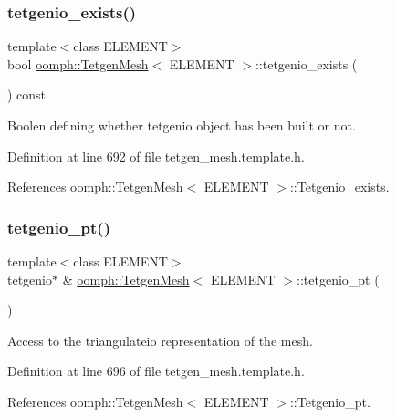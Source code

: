 \subsubsection{\texorpdfstring{tetgenio\+\_\+exists()}{tetgenio\_exists()}}
{\footnotesize\ttfamily template$<$class E\+L\+E\+M\+E\+NT$>$ \\
bool \hyperlink{classoomph_1_1TetgenMesh}{oomph\+::\+Tetgen\+Mesh}$<$ E\+L\+E\+M\+E\+NT $>$\+::tetgenio\+\_\+exists (\begin{DoxyParamCaption}{ }\end{DoxyParamCaption}) const\hspace{0.3cm}{\ttfamily [inline]}}



Boolen defining whether tetgenio object has been built or not. 



Definition at line 692 of file tetgen\+\_\+mesh.\+template.\+h.



References oomph\+::\+Tetgen\+Mesh$<$ E\+L\+E\+M\+E\+N\+T $>$\+::\+Tetgenio\+\_\+exists.

\mbox{\label{classoomph_1_1TetgenMesh_a47071bb8a8c0df965a5e013f0a8fb1ba}} 
\subsubsection{\texorpdfstring{tetgenio\+\_\+pt()}{tetgenio\_pt()}}
{\footnotesize\ttfamily template$<$class E\+L\+E\+M\+E\+NT$>$ \\
tetgenio$\ast$ \& \hyperlink{classoomph_1_1TetgenMesh}{oomph\+::\+Tetgen\+Mesh}$<$ E\+L\+E\+M\+E\+NT $>$\+::tetgenio\+\_\+pt (\begin{DoxyParamCaption}{ }\end{DoxyParamCaption})\hspace{0.3cm}{\ttfamily [inline]}}



Access to the triangulateio representation of the mesh. 



Definition at line 696 of file tetgen\+\_\+mesh.\+template.\+h.



References oomph\+::\+Tetgen\+Mesh$<$ E\+L\+E\+M\+E\+N\+T $>$\+::\+Tetgenio\+\_\+pt.



